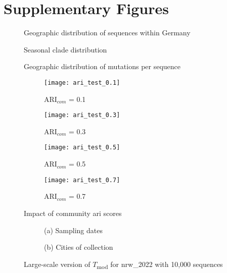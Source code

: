 \section{Supplementary Figures}
\label{app:supplementary_figures}
    \begin{figure}[ht!]
      \centering
        
        \caption{Geographic distribution of sequences within Germany}
        \label{fig:geographic_sequence_distribution}
    \end{figure}
    \clearpage
    \begin{figure}[ht!]
      \centering
        
        \caption{Seasonal clade distribution}
        \label{fig:clade_distribution_over_time}
    \end{figure}
    \begin{figure}[ht!]
      \centering
        
        \caption{Geographic distribution of mutations per sequence}
        \label{fig:median_mutations_per_federal_state}
    \end{figure}
    \clearpage
\begin{figure}[ht!]
  \centering
    \begin{subfigure}[b]{0.495\textwidth}
            \texttt{[image: ari\_test\_0.1]}
    \caption*{$\text{ARI}_{com}$ = 0.1}
    \end{subfigure}
    \hfill
    \begin{subfigure}[b]{0.495\textwidth}
            \texttt{[image: ari\_test\_0.3]}
    \caption*{$\text{ARI}_{com}$ = 0.3}
    \end{subfigure}
  \hfill
    \begin{subfigure}[b]{0.495\textwidth}
            \texttt{[image: ari\_test\_0.5]}
    \caption*{$\text{ARI}_{com}$ = 0.5}
    \end{subfigure}
  \hfill
    \begin{subfigure}[b]{0.495\textwidth}
            \texttt{[image: ari\_test\_0.7]}
    \caption*{$\text{ARI}_{com}$ = 0.7}
    \end{subfigure}
    \caption{Impact of community \acrshort{ari} scores}
    \label{fig:community_ari_impact}
\end{figure}
\clearpage
  \begin{figure}[ht!]
  \centering
    \begin{subfigure}[b]{.8\textwidth}
            
    \caption*{(a) Sampling dates}
    \end{subfigure}
    \par\vspace{1em}
    \begin{subfigure}[b]{.8
    \textwidth}
            
    \caption*{(b) Cities of collection}
    \end{subfigure}
    \caption{Large-scale version of $T$\textsubscript{mod} for nrw\_2022 with 10,000 sequences}
    \label{fig:large_scale_sampling_date_optimized}
    \end{figure}
